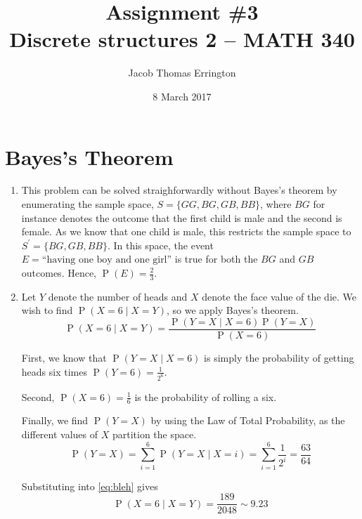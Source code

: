 \documentclass[letterpaper,11pt]{article}
\author{Jacob Thomas Errington}
\title{Assignment \#3\\Discrete structures 2 -- MATH 340}
\date{8 March 2017}
\DeclareMathOperator{\Prob}{P}
\renewcommand{\P}[1]{\Prob{\parens{#1}}}
\newcommand{\parens}[1]{\left(#1\right)}
\newcommand{\given}{\;\vert\;}
\newcommand{\question}{\section}
\begin{document}
\maketitle

\question{Bayes's Theorem}

\begin{enumerate}
    \item
        This problem can be solved straighforwardly without Bayes's theorem
        by enumerating the sample space, $S = \{GG, BG, GB, BB\}$, where $BG$
        for instance denotes the outcome that the first child is male and the
        second is female. As we know that one child is male, this restricts the
        sample space to $S^\prime = \{BG, GB, BB\}$. In this space, the event
        $E = \text{``having one boy and one girl''}$ is true for both the $BG$
        and $GB$ outcomes.
        Hence, $\P{E} = \frac{2}{3}$.

    \item
        Let $Y$ denote the number of heads and $X$ denote the face value of the
        die. We wish to find $\P{X = 6 \given X = Y}$, so we apply Bayes's
        theorem.
        \begin{equation}
            \label{eq:bleh}
            \P{X = 6 \given X = Y} = \frac{
                \P{Y = X \given X = 6} \P{Y = X}
            }{
                \P{X = 6}
            }
        \end{equation}

        First, we know that $\P{Y = X \given X = 6}$ is simply the probability
        of getting heads six times $\P{Y = 6} = \frac{1}{2^6}$.

        Second, $\P{X = 6} = \frac{1}{6}$ is the probability of rolling a six.

        Finally, we find $\P{Y = X}$ by using the Law of Total Probability, as
        the different values of $X$ partition the space.
        \begin{equation*}
            \P{Y = X} = \sum_{i = 1}^6 {
                \P{Y = X \given X = i}
            }
            =
            \sum_{i=1}^6 {
                \frac{1}{2^i}
            }
            = \frac{63}{64}
        \end{equation*}

        Substituting into \eqref{eq:bleh} gives
        \begin{equation*}
            \P{X = 6 \given X = Y}
            = \frac{189}{2048} \sim 9.23
        \end{equation*}
\end{enumerate}
\end{document}
